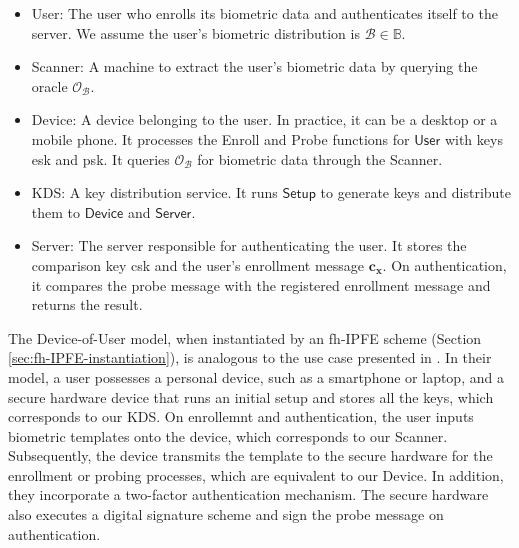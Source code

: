 \begin{itemize}

	\item \textsf{User}: The user who enrolls its biometric data and authenticates itself to the server. We assume the user's biometric distribution is $\mathcal{B} \in \mathbb{B}$. 

	\item \textsf{Scanner}: A machine to extract the user's biometric data by querying the oracle $\mathcal{O}_{\mathcal{B}}$.
	
	\item \textsf{Device}: A device belonging to the user. In practice, it can be a desktop or a mobile phone. It processes the \textsf{Enroll} and \textsf{Probe} functions for $\textsf{User}$ with keys \textsf{esk} and \textsf{psk}. It queries $\mathcal{O}_{\mathcal{B}}$ for biometric data through the \textsf{Scanner}.
	
	\item \textsf{KDS}: A key distribution service. It runs $\textsf{Setup}$ to generate keys and distribute them to $\textsf{Device}$ and $\textsf{Server}$.
		
	\item \textsf{Server}: The server responsible for authenticating the user. It stores the comparison key \textsf{csk} and the user's enrollment message $\mathbf{c_x}$. On authentication, it compares the probe message with the registered enrollment message and returns the result.  

\end{itemize}

The Device-of-User model, when instantiated by an fh-IPFE scheme (Section \ref{sec:fh-IPFE-instantiation}), is analogous to the use case presented in \cite{cryptoeprint:2023/481}.
In their model, a user possesses a personal device, such as a smartphone or laptop, and a secure hardware device that runs an initial setup and stores all the keys, which corresponds to our \textsf{KDS}.
On enrollemnt and authentication, the user inputs biometric templates onto the device, which corresponds to our \textsf{Scanner}.
Subsequently, the device transmits the template to the secure hardware for the enrollment or probing processes, which are equivalent to our \textsf{Device}.
In addition, they incorporate a two-factor authentication mechanism.
The secure hardware also executes a digital signature scheme and sign the probe message on authentication.




